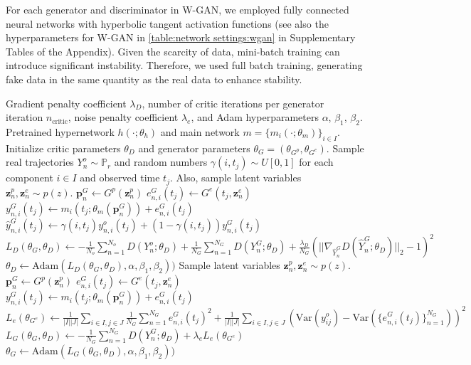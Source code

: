 \documentclass[letterpaper]{article} %
\theoremstyle{thmstyleone}%
\theoremstyle{thmstyletwo}%
\theoremstyle{thmstylethree}%
\begin{document}
For each generator and discriminator in W-GAN, we employed fully connected neural networks with hyperbolic tangent activation functions (see also the hyperparameters for W-GAN in \cref{table:network settings:wgan} in Supplementary Tables of the Appendix). Given the scarcity of data, mini-batch training can introduce significant instability. Therefore, we used full batch training, generating fake data in the same quantity as the real data to enhance stability.
\begin{algorithm}\caption{Training process for SiGMoiD}\label{alg:SiGMoiD}
\begin{algorithmic}
\Require Gradient penalty coefficient $\lambda_{D}$, number of critic iterations per generator iteration $n_{\text{critic}}$, noise penalty coefficient $\lambda_{e}$, and Adam hyperparameters $\alpha$, $\beta_1$, $\beta_2$.
\Require Pretrained hypernetwork $h(\cdot; \theta_{h})$ and main network $m = \{m_{i}(\cdot; \theta_{m})\}_{i \in I}$.
\Require Initialize critic parameters $\theta_{D}$ and generator parameters $\theta_{G} = (\theta_{G^{p}}, \theta_{G^{e}})$.
        \State Sample real trajectories $Y_{n}^{o} \sim \mathbb{P}_{r}$ and random numbers $\gamma(i,t_{j}) \sim U[0,1]$ for each component $i \in I$ and observed time $t_{j}$. Also, sample latent variables $\boldsymbol{z}_{n}^{p},\boldsymbol{z}_{n} ^{e} \sim p(z)$.
        \State $\boldsymbol{p}_{n}^{G} \leftarrow G^{p}(\boldsymbol{z}_{n}^{p})$
        \State $e_{n,i}^{G}(t_{j}) \leftarrow G^{e}(t_{j},\boldsymbol{z}_{n}^{e})$
        \State $y_{n,i}^{G}(t_{j}) \leftarrow m_{i}(t_{j};\theta_{m}(\boldsymbol{p}_{n}^{G}))+e_{n,i}^{G}(t_{j})$
        \State $\hat{y}_{n,i}^{G}(t_{j}) \leftarrow \gamma(i,t_{j}) y_{n,i}^{o}(t_{j}) + (1-\gamma(i,t_{j}))y_{n,i}^{G}(t_{j})$
        \State $L_{D}(\theta_{G},\theta_{D}) \leftarrow -\frac{1}{N_{o}}\sum_{n=1}^{N_{o}}D(Y_{n}^{o};\theta_{D})+\frac{1}{N_{G}}\sum_{n=1}^{N_{G}}D(Y_{n}^{G};\theta_{D})+\frac{\lambda_{D}}{N_{G}}(||\nabla_{\hat{Y}_{n}^{G}}D(\hat{Y}_{n}^{G};\theta_{D})||_{2}-1)^{2}$
        \State $\theta_{D} \leftarrow \text{Adam}(L_{D}(\theta_{G},\theta_{D}),\alpha,\beta_{1},\beta_{2}))$
    \EndFor
    \State Sample latent variables $\boldsymbol{z}_{n}^{p},\boldsymbol{z}_{n} ^{e} \sim p(z)$.
    \State $\boldsymbol{p}_{n}^{G} \leftarrow G^{p}(\boldsymbol{z}_{n}^{p})$
    \State $e_{n,i}^{G}(t_{j}) \leftarrow G^{e}(t_{j},\boldsymbol{z}_{n}^{e})$
    \State $y_{n,i}^{G}(t_{j}) \leftarrow m_{i}(t_{j};\theta_{m}(\boldsymbol{p}_{n}^{G}))+e_{n,i}^{G}(t_{j})$
     \State $L_{e}(\theta_{G^{e}}) \leftarrow \frac{1}{|I||J|}\sum_{i \in I, j \in J }\frac{1}{N_{G}}\sum_{n=1}^{N_{G}}e_{n,i}^{G}(t_{j})^{2} + \frac{1}{|I||J|}\sum_{i \in I, j \in J }(\text{Var}(y_{ij}^{o}) - \text{Var}(\{e_{n,i}^{G}(t_{j})\}_{n=1}^{N_{G}}))^{2}$
    \State $L_{G}(\theta_{G},\theta_{D}) \leftarrow -\frac{1}{N_{G}}\sum_{n=1}^{N_{G}}D(Y_{n}^{G};\theta_{D})+\lambda_{e}L_{e}(\theta_{G^{e}})$
    \State $\theta_{G} \leftarrow \text{Adam}(L_{G}(\theta_{G},\theta_{D}),\alpha,\beta_{1},\beta_{2}))$
\EndWhile
\end{algorithmic}
\end{algorithm}
\end{document}
